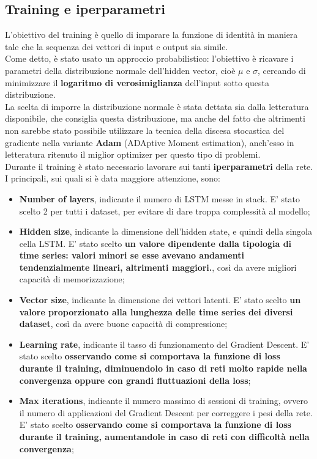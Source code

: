 \subsection{Training e iperparametri}
L'obiettivo del training è quello di imparare la funzione di identità in maniera tale che la sequenza dei vettori di input e output sia simile.\\ 
Come detto, è stato usato un approccio probabilistico: l'obiettivo è ricavare i parametri della distribuzione normale dell'hidden vector, cioè $\mu$ e $\sigma$, cercando di minimizzare il \textbf{logaritmo di verosimiglianza} dell'input sotto questa distribuzione.\\
La scelta di imporre la distribuzione normale è stata dettata sia dalla letteratura disponibile, che consiglia questa distribuzione, ma anche del fatto che altrimenti non sarebbe stato possibile utilizzare la tecnica della discesa stocastica del gradiente nella variante \textbf{Adam} (ADAptive Moment estimation), anch'esso in letteratura ritenuto il miglior optimizer per questo tipo di problemi.
\\
Durante il training è stato necessario lavorare sui tanti \textbf{iperparametri} della rete. I principali, sui quali si è data maggiore attenzione, sono:
\begin{itemize}
	\item \textbf{Number of layers}, indicante il numero di LSTM messe in stack. E' stato scelto 2 per tutti i dataset, per evitare di dare troppa complessità al modello;
	
	\item \textbf{Hidden size}, indicante la dimensione dell'hidden state, e quindi della singola cella LSTM. E' stato scelto \textbf{un valore dipendente dalla tipologia di time series: valori minori se esse avevano andamenti tendenzialmente lineari, altrimenti maggiori.}, così da avere migliori capacità di memorizzazione;
	
	\item \textbf{Vector size}, indicante la dimensione dei vettori latenti. E' stato scelto \textbf{un valore proporzionato alla lunghezza delle time series dei diversi dataset}, così da avere buone capacità di compressione;
	
	\item \textbf{Learning rate}, indicante il tasso di funzionamento del Gradient Descent. E' stato scelto \textbf{osservando come si comportava la funzione di loss durante il training, diminuendolo in caso di reti molto rapide nella convergenza oppure con grandi fluttuazioni della loss};
	
	\item \textbf{Max iterations}, indicante il numero massimo di sessioni di training, ovvero il numero di applicazioni del Gradient Descent per correggere i pesi della rete. E' stato scelto \textbf{osservando come si comportava la funzione di loss durante il training, aumentandole in caso di reti con difficoltà nella convergenza};
	
\end{itemize}
